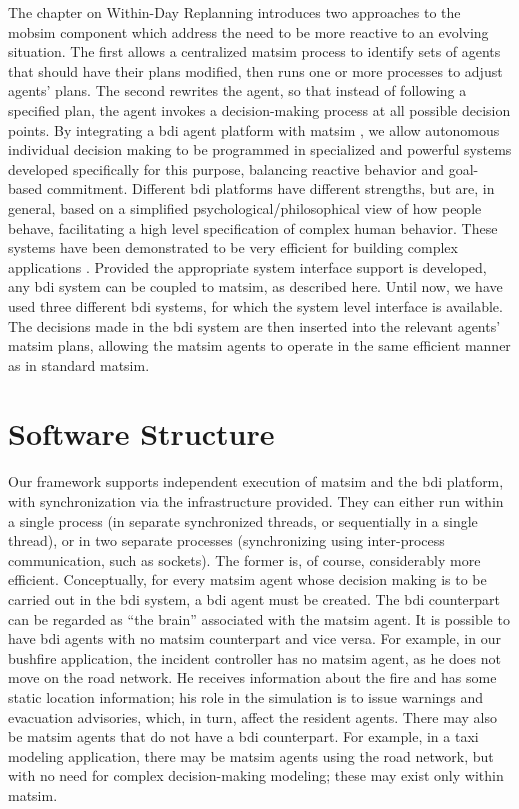 The chapter on Within-Day Replanning introduces two approaches to the
\gls{mobsim} component which address the need to be more reactive to an
evolving situation. The first allows a centralized \gls{matsim} process to
identify sets of agents that should have their plans modified, then
runs one or more processes to adjust agents' plans. The
second rewrites the agent, so that instead of
following a specified plan, the agent invokes a decision-making
process at all possible decision points. By integrating a \gls{bdi} agent
platform with \gls{matsim} \citep{ecai}, we allow autonomous individual
decision making to be programmed in specialized and powerful systems
developed specifically for this purpose, balancing
reactive behavior and goal-based commitment. Different \gls{bdi} platforms
have different strengths, but are, in general, based on a simplified
psychological/philosophical view of how people behave, facilitating a
high level specification of complex human behavior. These systems have
been demonstrated to be very efficient for building complex
applications \citep{benfield}.  Provided the appropriate system
interface support is developed, any \gls{bdi} system can be coupled to
\gls{matsim}, as described here. Until now, we have used three different \gls{bdi}
systems, for which the system level interface is available.  The
decisions made in the \gls{bdi} system are then inserted into the relevant agents' \gls{matsim}
plans, allowing the \gls{matsim} agents to operate in
the same efficient manner as in standard \gls{matsim}.

\section{Software Structure}
\label{sec:bdi-structure}
Our framework supports independent  execution of  \gls{matsim} and the
\gls{bdi} platform, with   
synchronization via the infrastructure provided.
They can either run within a single process (in
separate synchronized threads, or sequentially in a single thread), or in two
separate processes (synchronizing using inter-process communication, such as
sockets). The former is, of course, considerably more efficient. 
%
Conceptually, for every \gls{matsim} agent whose decision making is to be
carried out in the \gls{bdi} system, a \gls{bdi} agent must be created. The \gls{bdi} counterpart can
be regarded as ``the brain'' associated with the \gls{matsim} agent. It is
possible to have \gls{bdi} agents with no \gls{matsim} counterpart and vice
versa. For example, in our bushfire application, the incident
controller has no \gls{matsim} agent, as he does not move on the road
network. He receives information about the fire and has some static
location information;  his role in the simulation is to issue
warnings and evacuation advisories, which, in turn, affect the resident
agents. There may also be \gls{matsim} agents that do not have a \gls{bdi}
counterpart. For example, in a taxi modeling application, there may be
\gls{matsim} agents using the road network, but with no need for
complex decision-making modeling; these may exist only within
\gls{matsim}. 

